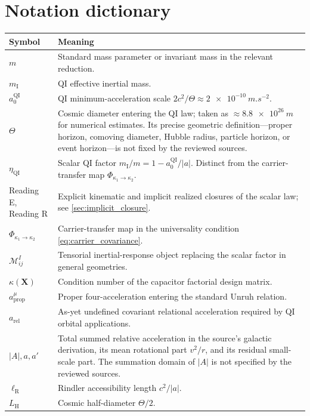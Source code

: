 \documentclass[11pt]{article}
\newcommand{\Carrier}{\kappa}
\newcommand{\QI}{\mathrm{QI}}
\newcommand{\ellR}{\ell_{\mathrm{R}}}
\newcommand{\LH}{L_{\mathrm{H}}}
\newcommand{\Mcal}{\mathcal{M}}
\begin{document}
\section{Notation dictionary}
\label{app:notation}
\begin{tabularx}{\textwidth}{>{\raggedright\arraybackslash}p{}X}
\toprule
Symbol & Meaning \\
\midrule
\(m\) & Standard mass parameter or invariant mass in the relevant reduction. \\
\(m_{\mathrm I}\) & QI effective inertial mass. \\
\(a_{0}^{\QI}\) & QI minimum-acceleration scale \(2c^{2}/\Theta\approx\SI{2e-10}{m.s^{-2}}\). \\
\(\Theta\) & Cosmic diameter entering the QI law; taken as \(\approx\SI{8.8e26}{m}\) for numerical estimates. Its precise geometric definition---proper horizon, comoving diameter, Hubble radius, particle horizon, or event horizon---is not fixed by the reviewed sources. \\
\(\eta_{\QI}\) & Scalar QI factor \(m_{\mathrm I}/m=1-a_{0}^{\QI}/|a|\). Distinct from the carrier-transfer map \(\Phi_{\Carrier_1\to\Carrier_2}\). \\
Reading E, Reading R & Explicit kinematic and implicit realized closures of the scalar law; see \cref{sec:implicit_closure}. \\
\(\Phi_{\Carrier_1\to\Carrier_2}\) & Carrier-transfer map in the universality condition \cref{eq:carrier_covariance}. \\
\(\Mcal^{I}_{ij}\) & Tensorial inertial-response object replacing the scalar factor in general geometries. \\
\(\kappa(\mathbf X)\) & Condition number of the capacitor factorial design matrix. \\
\(a^{\mu}_{\mathrm{prop}}\) & Proper four-acceleration entering the standard Unruh relation. \\
\(a_{\mathrm{rel}}\) & As-yet undefined covariant relational acceleration required by QI orbital applications. \\
\(|A|,a,a'\) & Total summed relative acceleration in the source's galactic derivation, its mean rotational part \(v^{2}/r\), and its residual small-scale part. The summation domain of \(|A|\) is not specified by the reviewed sources. \\
\(\ellR\) & Rindler accessibility length \(c^{2}/|a|\). \\
\(\LH\) & Cosmic half-diameter \(\Theta/2\). \\

\end{tabularx}
\end{document}
